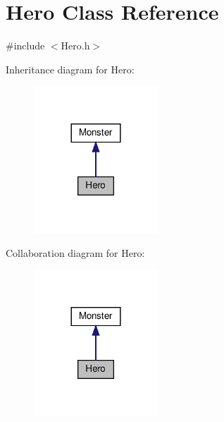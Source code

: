 \hypertarget{classHero}{}\section{Hero Class Reference}
\label{classHero}


{\ttfamily \#include $<$Hero.\+h$>$}



Inheritance diagram for Hero\+:
\nopagebreak
\begin{figure}[H]
\begin{center}
\leavevmode
\includegraphics[width=132pt]{classHero__inherit__graph}
\end{center}
\end{figure}


Collaboration diagram for Hero\+:
\nopagebreak
\begin{figure}[H]
\begin{center}
\leavevmode
\includegraphics[width=132pt]{classHero__coll__graph}
\end{center}
\end{figure}
